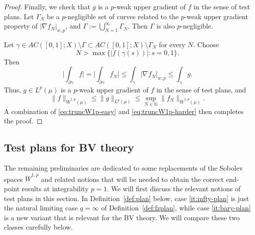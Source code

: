 \documentclass[11pt]{amsart}
\theoremstyle{definition}
\theoremstyle{remark}
\numberwithin{equation}{section}
\newcommand{\abs}[1]{|#1|}
\newcommand{\Babs}[1]{\Big|#1\Big|}
\newcommand{\Norm}[2]{\|#1\|_{#2}}
\begin{document}
\begin{proof}
Finally, we check that $g$ is a $p$-weak upper gradient of $f$ in the sense of test plans.
Let $\Gamma_N$ be a $p$-negligible set of curves related to the $p$-weak upper gradient
property of $\abs{\nabla f_N}_{w,p}$, and $\Gamma:=\bigcup_{N=1}^\infty\Gamma_N$. Then
$\Gamma$ is also $p$-negligible.

Let $\gamma\in AC([0,1];X)\setminus\Gamma\subset AC([0,1];X)\setminus\Gamma_N$ for every
$N$. Choose
$$N>\max\{\abs{f(\gamma(s))}:s=0,1\}.$$ Then
\begin{equation*}
  \Babs{\int_{\partial\gamma}f}
  =\Babs{\int_{\partial\gamma}f_N}
  \leq\int_\gamma\abs{\nabla f_N}_{w,p}
  \leq\int_\gamma g.
\end{equation*}
Thus, $g\in L^p(\mu)$ is a $p$-weak upper gradient of $f$ in the sense of test plans, and
\begin{equation}\label{eq:truncW1p-harder}
  \Norm{f}{\dot W^{1,p}(\mu)}\leq\Norm{g}{L^p(\mu)}
    \leq  \sup_{N\in\mathbb N}\Norm{f_N}{\dot W^{1,p}(\mu)}.
\end{equation}
A combination of \eqref{eq:truncW1p-easy} and \eqref{eq:truncW1p-harder}
then completes the proof.
\end{proof}


\subsection{Test plans for BV theory}\label{ss:planBV}

The remaining preliminaries are dedicated to some replacements of the Sobolev spaces $\dot
W^{1,p}$ and related notions that will be needed to obtain the correct end-point results at
integrability $p=1$. We will first discuss the relevant notions of test plans in this
section. In Definition~\ref{def:plan} below, case \eqref{it:infty-plan} is just the natural
limiting case $q=\infty$ of Definition~\ref{def:fzplan}, while case \eqref{it:bary-plan} is
a new variant that is relevant for the BV theory. We will compare these two classes
carefully below.
\end{document}
